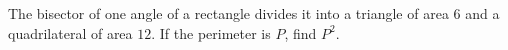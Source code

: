 The bisector of one angle of a rectangle divides it into a triangle of area $6$ and a quadrilateral of area $12$. If the perimeter is $P$, find $P^2$.
